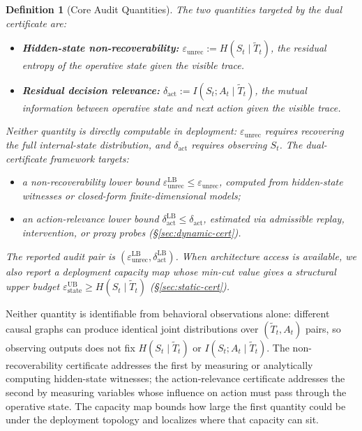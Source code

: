 \documentclass{article}
\newtheorem{definition}{Definition}
\begin{document}
  \begin{definition}[Core Audit Quantities]
  \label{def:certs}
  The two quantities targeted by the dual certificate are:
  \begin{itemize}
    \item \textbf{Hidden-state non-recoverability:}
  $\varepsilon_\text{unrec} :=
  H(S_t \mid \tilde T_t)$, the residual entropy of the operative state given the
   visible trace.
    \item \textbf{Residual decision relevance:} $\delta_\text{act} := I(S_t; A_t
   \mid \tilde T_t)$, the mutual information between operative state and next
  action given the visible trace.
  \end{itemize}
  Neither quantity is directly computable in deployment:
  $\varepsilon_\text{unrec}$ requires recovering the full internal-state
  distribution, and $\delta_\text{act}$ requires observing $S_t$. The
  dual-certificate framework targets:
  \begin{itemize}
    \item a \emph{non-recoverability lower bound}
  $\varepsilon_\text{unrec}^\text{LB}\leq \varepsilon_\text{unrec}$, computed
  from hidden-state witnesses or closed-form finite-dimensional models;
    \item an \emph{action-relevance lower bound}
  $\delta_\text{act}^\text{LB} \leq \delta_\text{act}$, estimated via
  admissible replay, intervention, or proxy probes (\S\ref{sec:dynamic-cert}).
  \end{itemize}
  The reported audit pair is $(\varepsilon_\text{unrec}^\text{LB},
  \delta_\text{act}^\text{LB})$. When architecture access is available, we also
  report a deployment capacity map whose min-cut value gives a structural upper
  budget $\varepsilon_\text{state}^\text{UB}\geq H(S_t\mid\tilde T_t)$
  (\S\ref{sec:static-cert}).
  \end{definition}

  Neither quantity is identifiable from behavioral observations alone: different
   causal graphs can produce identical joint distributions over $(\tilde T_t,
  A_t)$ pairs, so observing outputs does not fix $H(S_t \mid \tilde T_t)$ or
  $I(S_t; A_t \mid \tilde T_t)$. The non-recoverability certificate addresses
  the first by measuring or analytically computing hidden-state witnesses; the
  action-relevance certificate addresses the second by measuring variables
  whose influence on action must pass through the operative state. The capacity
  map bounds how large the first quantity could be under the deployment
  topology and localizes where that capacity can sit.
\end{document}
